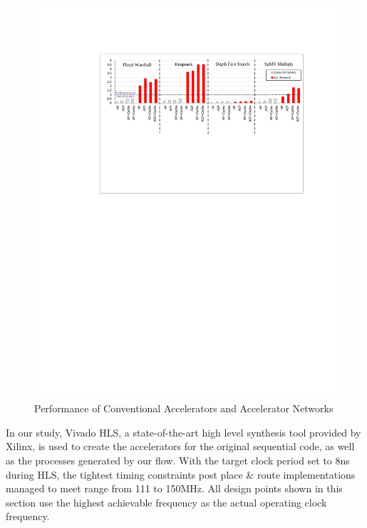\documentclass{sig-alternate}
\begin{document}
\begin{table}[htbp]
\begin{tabular}{| c | c | c | }
  \hline      
  
\end{tabular}
\vspace{-0.5em}
\label{tab:datasize}
\end{table}



\begin{figure}[htp]
\begin{center}
\includegraphics[width=0.95\linewidth]{fig/perfNew.pdf}
\vspace{-1.0em}
\caption{Performance of Conventional Accelerators and Accelerator Networks
\label{fig:acpraw}}
\end{center}
\vspace{-2.0em}
\end{figure} 


In our study, Vivado HLS, a state-of-the-art high level synthesis tool provided by Xilinx,
is used to create the accelerators for the original sequential code, as well as the processes generated by our flow. With the target clock period set to 
8ns during HLS, the tightest timing constraints post place \& route implementations managed to meet range from 111 to 150MHz. 
All design points shown in this section 
use the highest achievable frequency as the actual operating clock frequency. 
\end{document}
